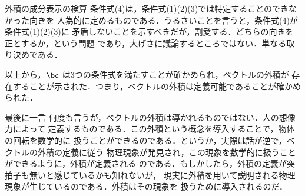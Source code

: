 \begin{mysmallsec}{外積の成分表示の検算}
                条件式(4)は，条件式(1)(2)(3)では特定することのできなかった向きを
                人為的に定めるものである．うるさいことを言うと，条件式(4)が条件式(1)(2)(3)に
                矛盾しないことを示すべきだが，割愛する．どちらの向きを正とするか，という問題
                であり，大げさに議論するところではない．単なる取り決めである．

                以上から，$\bc$ は3つの条件式を満たすことが確かめられ，ベクトルの外積が
                存在することが示された．つまり，ベクトルの外積は定義可能であることが確かめられた．
            \end{mysmallsec}

            \begin{mysmallsec}{最後に一言}
                何度も言うが，ベクトルの外積は導かれるものではない．人の想像力によって
                定義するものである．この外積という概念を導入することで，物体の回転を数学的に
                扱うことができるのである．というか，実際は話が逆で，ベクトルの外積の定義に従う
                物理現象が発見され，この現象を数学的に扱うことができるように，外積が定義される
                のである．もしかしたら，外積の定義が突拍子も無いと感じているかも知れないが，
                現実に外積を用いて説明される物理現象が生じているのである．外積はその現象を
                扱うために導入されるのだ．
            \end{mysmallsec}

